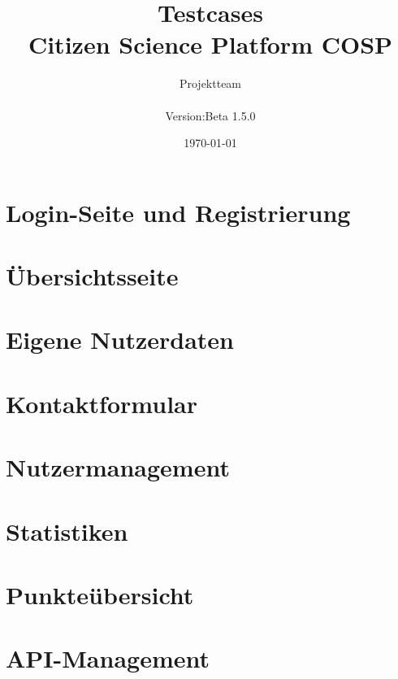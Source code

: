 \documentclass[a4paper, 10pt, oneside, draft]{article}
\begin{document}
\title{Testcases \\ \normalsize{Citizen Science Platform {\glqq COSP\grqq}} }
\date{\today}
\author{Projektteam \\
	\normalsize{
		\begin{tabular}[t]{ll}
			Version:  & \quad Beta 1.5.0 \\[1.2ex]
		\end{tabular}
	}
}
\maketitle

\newpage
\tableofcontents
\newpage
\setcounter{page}{1}
\section{Login-Seite und Registrierung}

\newpage
\section{Übersichtsseite}

\newpage
\section{Eigene Nutzerdaten}

\newpage
\section{Kontaktformular}

\newpage
\section{Nutzermanagement}

\newpage
\section{Statistiken}

\newpage
\section{Punkteübersicht}

\newpage
\section{API-Management}

\end{document}

